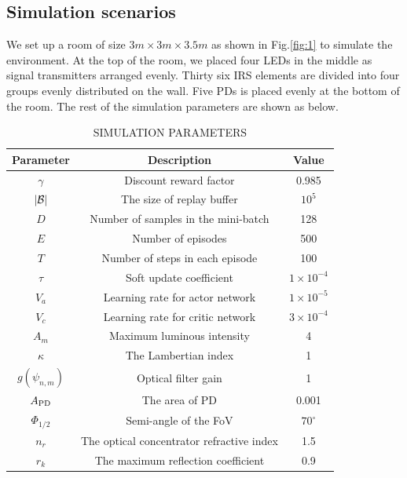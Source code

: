 \documentclass[conference]{IEEEtran}
\begin{document}
\subsection{Simulation scenarios}
We set up a room of size $3m \times 3m \times 3.5m$ as shown in Fig.\ref{fig:1} to simulate the environment. 
At the top of the room, we placed four LEDs in the middle 
as signal transmitters arranged evenly. Thirty six IRS elements are divided 
into four groups evenly distributed on the wall. Five PDs is placed evenly at the 
bottom of the room. The rest of the simulation parameters are shown as below.
\begin{table}[h]
\centering
\caption{SIMULATION PARAMETERS}
\begin{tabular}{ccc} %
\hline %
Parameter & Description & Value \\ %
\hline %
$\gamma$ & Discount reward factor & 0.985 \\
$\left| {\cal B} \right|$ & The size of replay buffer & ${10^5}$ \\
$D$ & Number of samples in the mini-batch & 128 \\
$E$ & Number of episodes & 500 \\
$T$ & Number of steps in each episode & 100 \\
$\tau$ & Soft update coefficient & $1 \times {10^{-4}}$ \\
${V_a}$ & Learning rate for actor network & $1 \times {10^{ - 5}}$ \\
${V_c}$ & Learning rate for critic network & $3 \times {10^{ - 4}}$ \\
${A_m}$ & Maximum luminous intensity & 4 \\
$\kappa$ & The Lambertian index & 1 \\
$g({\psi _{n,m}})$ & Optical filter gain & 1 \\
${A_{{\rm{PD}}}}$ & The area of PD & 0.001 \\
${\Phi _{1/2}}$ & Semi-angle of the FoV & ${70^ \circ }$ \\
$n_r$ &  The optical concentrator refractive index & 1.5 \\
${r_k}$ & The maximum reflection coefficient & 0.9 \\
\hline %
\end{tabular}
\label{tab:example}
\end{table}
\end{document}
